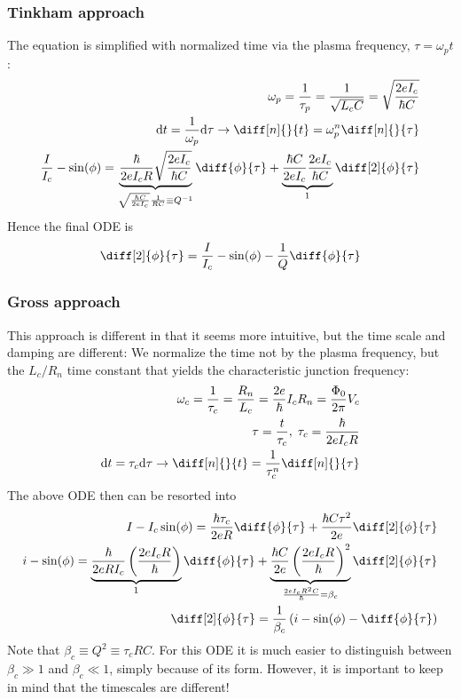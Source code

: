 \documentclass[reprint,onecolumn,%
amsmath,amssymb,aip,apl]{revtex4-1}
\begin{document}
	\subsubsection{Tinkham approach}
	The equation is simplified with normalized time via the plasma frequency, $\tau=\omega_p t$:
	\begin{eqnarray}
	\omega_p=\frac{1}{\tau_p}=\frac{1}{\sqrt{L_c C}}=\sqrt{\frac{2eI_c}{\hbar C}} \\%
	{\rm d}t=\frac{1}{\omega_p}{\rm d}\tau \rightarrow \diff[n]{}{t}=\omega_p^n \diff[n]{}{\tau} \\%
	\frac{I}{I_c}-\sin(\phi) = \underbrace{\frac{\hbar}{2eI_cR}\sqrt{\frac{2eI_c}{\hbar C}}}_{\sqrt{\frac{\hbar C}{2eI_c}}\frac{1}{RC}\equiv Q^{-1}}\diff{\phi}{\tau}+\underbrace{\frac{\hbar C}{2eI_c}\frac{2eI_c}{\hbar C}}_{1}\diff[2]{\phi}{\tau}
	\end{eqnarray}
	Hence the final ODE is
	\begin{eqnarray}
	\diff[2]{\phi}{\tau}=\frac{I}{I_c}-\sin(\phi)-\frac{1}{Q}\diff{\phi}{\tau}
	\label{eq:tinkham}
	\end{eqnarray}
	
	\subsubsection{Gross approach}
	This approach is different in that it seems more intuitive, but the time scale and damping are different:
	We normalize the time not by the plasma frequency, but the $L_c/R_n$ time constant that yields the characteristic junction frequency:
	\begin{eqnarray}
	\omega_c=\frac{1}{\tau_c}=\frac{R_n}{L_c}=\frac{2e}{\hbar}I_cR_n=\frac{\Phi_0}{2\pi}V_c \\%
	\tau=\frac{t}{\tau_c}, \; \tau_c=\frac{\hbar}{2e I_cR} \\%
	{\rm d}t=\tau_c{\rm d}\tau \rightarrow \diff[n]{}{t}=\frac{1}{\tau_c^{n}}\diff[n]{}{\tau}
	\end{eqnarray}
	The above ODE then can be resorted into
	\begin{eqnarray}
	I-I_c\sin(\phi)=\frac{\hbar\tau_c}{2eR}\diff{\phi}{\tau}+\frac{\hbar C \tau^2}{2e}\diff[2]{\phi}{\tau} \\%
	i-\sin(\phi)=\underbrace{\frac{\hbar}{2eRI_c}\left(\frac{2eI_cR}{\hbar}\right)}_{1}\diff{\phi}{\tau}+\underbrace{\frac{\hbar C}{2e}\left(\frac{2eI_cR}{\hbar}\right)^2}_{\frac{2eI_cR^2C}{\hbar}=\beta_c} \diff[2]{\phi}{\tau} \\%
	\diff[2]{\phi}{\tau} = \frac{1}{\beta_c}\left(i-\sin(\phi)-\diff{\phi}{\tau}\right)
	\label{eq:gross}
	\end{eqnarray}
	Note that $\beta_c\equiv Q^2\equiv\tau_c RC$.
	For this ODE it is much easier to distinguish between $\beta_c\gg1$ and $\beta_c\ll1$, simply because of its form.
	However, it is important to keep in mind that the timescales are different!
	
\end{document}
